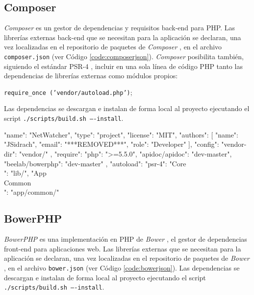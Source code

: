 \subsection*{Composer\label{extra:mvc:composer}}

\textit{Composer} es un gestor de dependencias y requisitos \gls{back-end} para \gls{PHP}. Las librerías externas \gls{back-end} que se necesitan para la aplicación se declaran, una vez localizadas en el repositorio de paquetes de \textit{Composer} \cite{composerrepositorio}, en el archivo \texttt{composer.json} (ver Código \ref{code:composerjson}). \textit{Composer} posibilita también, siguiendo el estándar PSR-4 \cite{psr4}, incluir en una sola línea de código \gls{PHP} tanto las dependencias de librerías externas como módulos propios:

\texttt{require\_once ('vendor/autoload.php')};

Las dependencias se descargan e instalan de forma local al proyecto ejecutando el \gls{script} \texttt{./scripts/build.sh ----install}.

\begin{code}[label=code:composerjson,language=json,caption=Ejemplo de fichero \textit{composer.json}]
{
  "name": "NetWatcher",
  "type": "project",
  "license": "MIT",
  "authors": [
    {
      "name": "JSidrach",
      "email": "***REMOVED***",
      "role": "Developer"
    }
  ],
  "config": {
    "vendor-dir": "vendor/"
   },
  "require": {
    "php": ">=5.5.0",
    "apidoc/apidoc": "dev-master",
    "beelab/bowerphp": "dev-master"
  },
  "autoload": {
    "psr-4": {
      "Core\\": "lib/",
      "App\\Common\\": "app/common/"
    }
  }
}
\end{code}

\subsection*{BowerPHP\label{extra:mvc:bowerphp}}

\textit{BowerPHP} es una implementación en \gls{PHP} de \textit{Bower} \cite{bower}, el gestor de dependencias \gls{front-end} para aplicaciones web. Las librerías externas que se necesitan para la aplicación se declaran, una vez localizadas en el repositorio de paquetes de \textit{Bower} \cite{bowerrepositorio}, en el archivo \texttt{bower.json} (ver Código \ref{code:bowerjson}). Las dependencias se descargan e instalan de forma local al proyecto ejecutando el \gls{script} \texttt{./scripts/build.sh ----install}.

